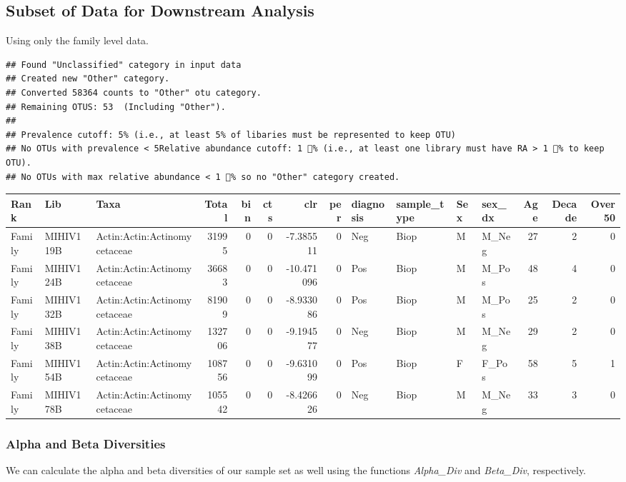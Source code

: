 \documentclass[]{article}
\begin{document}
\subsection{Subset of Data for Downstream
Analysis}\label{subset-of-data-for-downstream-analysis}

Using only the family level data.

\begin{verbatim}
## Found "Unclassified" category in input data
## Created new "Other" category.
## Converted 58364 counts to "Other" otu category.
## Remaining OTUS: 53  (Including "Other").
## 
## Prevalence cutoff: 5% (i.e., at least 5% of libaries must be represented to keep OTU)
## No OTUs with prevalence < 5Relative abundance cutoff: 1 % (i.e., at least one library must have RA > 1 % to keep OTU).
## No OTUs with max relative abundance < 1 % so no "Other" category created.
\end{verbatim}

\begin{longtable}[]{@{}lllrrrrrllllrrr@{}}
\toprule
Rank & Lib & Taxa & Total & bin & cts & clr & per & diagnosis &
sample\_type & Sex & sex\_dx & Age & Decade & Over50\tabularnewline
\midrule
\endhead
Family & MIHIV119B & Actin:Actin:Actinomycetaceae & 31995 & 0 & 0 &
-7.385511 & 0 & Neg & Biop & M & M\_Neg & 27 & 2 & 0\tabularnewline
Family & MIHIV124B & Actin:Actin:Actinomycetaceae & 36683 & 0 & 0 &
-10.471096 & 0 & Pos & Biop & M & M\_Pos & 48 & 4 & 0\tabularnewline
Family & MIHIV132B & Actin:Actin:Actinomycetaceae & 81909 & 0 & 0 &
-8.933086 & 0 & Pos & Biop & M & M\_Pos & 25 & 2 & 0\tabularnewline
Family & MIHIV138B & Actin:Actin:Actinomycetaceae & 132706 & 0 & 0 &
-9.194577 & 0 & Neg & Biop & M & M\_Neg & 29 & 2 & 0\tabularnewline
Family & MIHIV154B & Actin:Actin:Actinomycetaceae & 108756 & 0 & 0 &
-9.631099 & 0 & Pos & Biop & F & F\_Pos & 58 & 5 & 1\tabularnewline
Family & MIHIV178B & Actin:Actin:Actinomycetaceae & 105542 & 0 & 0 &
-8.426626 & 0 & Neg & Biop & M & M\_Neg & 33 & 3 & 0\tabularnewline
\bottomrule
\end{longtable}

\subsubsection{Alpha and Beta
Diversities}\label{alpha-and-beta-diversities}

We can calculate the alpha and beta diversities of our sample set as
well using the functions \emph{Alpha\_Div} and \emph{Beta\_Div},
respectively.
\end{document}
